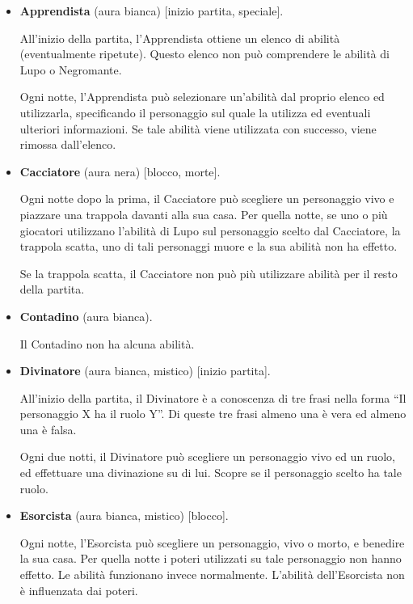 \documentclass[a4paper,10pt]{article}
\begin{document}
\begin{itemize}

    \item {\bf Apprendista} (aura bianca) [inizio partita, speciale].

          All'inizio della partita, l'Apprendista ottiene un elenco di abilità (eventualmente ripetute). Questo elenco non può comprendere le abilità di Lupo o Negromante.

          Ogni notte, l'Apprendista può selezionare un'abilità dal proprio elenco ed utilizzarla, specificando il personaggio sul quale la utilizza ed eventuali ulteriori informazioni. Se tale abilità viene utilizzata con successo, viene rimossa dall'elenco.

    \item {\bf Cacciatore} (aura nera) [blocco, morte].

          Ogni notte dopo la prima, il Cacciatore può scegliere un personaggio vivo e piazzare una trappola davanti alla sua casa. Per quella notte, se uno o più giocatori utilizzano l'abilità di Lupo sul personaggio scelto dal Cacciatore, la trappola scatta, uno di tali personaggi muore e la sua abilità non ha effetto.

          Se la trappola scatta, il Cacciatore non può più utilizzare abilità per il resto della partita.

    \item {\bf Contadino} (aura bianca).

          Il Contadino non ha alcuna abilità.

    \item {\bf Divinatore} (aura bianca, mistico) [inizio partita].

          All'inizio della partita, il Divinatore è a conoscenza di tre frasi nella forma ``Il personaggio X ha il ruolo Y''. Di queste tre frasi almeno una è vera ed almeno una è falsa.

          Ogni due notti, il Divinatore può scegliere un personaggio vivo ed un ruolo, ed effettuare una divinazione su di lui. Scopre se il personaggio scelto ha tale ruolo.

    \item {\bf Esorcista} (aura bianca, mistico) [blocco].

          Ogni notte, l'Esorcista può scegliere un personaggio, vivo o morto, e benedire la sua casa. Per quella notte i poteri utilizzati su tale personaggio non hanno effetto. Le abilità funzionano invece normalmente. L'abilità dell'Esorcista non è influenzata dai poteri.


\end{itemize}
\end{document}

